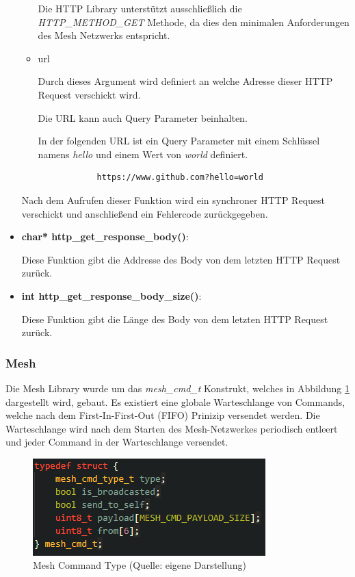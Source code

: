 \begin{itemize}
\begin{itemize}
        Die HTTP Library unterstützt ausschließlich die \textit{HTTP\_METHOD\_GET} Methode, da dies den minimalen Anforderungen des Mesh Netzwerks entspricht.

        \item url
        
        Durch dieses Argument wird definiert an welche Adresse dieser HTTP Request verschickt wird.

        Die URL kann auch Query Parameter beinhalten. 

        In der folgenden URL ist ein Query Parameter mit einem Schlüssel namens \textit{hello} und einem Wert von \textit{world} definiert.

        \begin{verbatim}
            https://www.github.com?hello=world
        \end{verbatim}
    \end{itemize}
    
    Nach dem Aufrufen dieser Funktion wird ein synchroner HTTP Request verschickt und anschließend ein Fehlercode zurückgegeben.

    \item \textbf{char* http\_get\_response\_body()}:
    
    Diese Funktion gibt die Addresse des Body von dem letzten HTTP Request zurück.

    \item \textbf{int http\_get\_response\_body\_size()}:
    
    Diese Funktion gibt die Länge des Body von dem letzten HTTP Request zurück.
\end{itemize}

\subsubsection{Mesh}\label{sec:own-libraries-mesh}

Die Mesh Library wurde um das \textit{mesh\_cmd\_t} Konstrukt, welches in Abbildung \ref{abb:mesh_cmd_t} dargestellt wird, gebaut. Es existiert eine globale Warteschlange von Commands, welche nach dem First-In-First-Out (FIFO) Prinizip versendet werden. Die Warteschlange wird nach dem Starten des Mesh-Netzwerkes periodisch entleert und jeder Command in der Warteschlange versendet.

\begin{figure}[H]
    \begin{center}
        \includegraphics[scale=1]{images/mesh_cmd_t.png}
        \caption{Mesh Command Type (Quelle: eigene Darstellung)}
        \label{abb:mesh_cmd_t}
    \end{center}
\end{figure}

